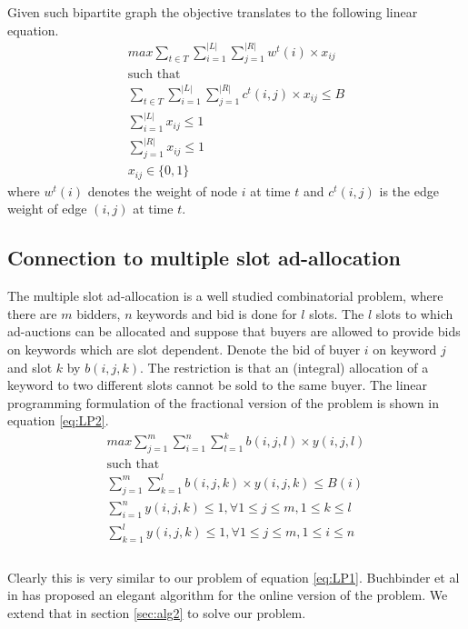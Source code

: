 Given such bipartite graph the objective translates to the following linear equation.\\
\begin{equation}\label{eq:LP1}
\begin{split}
max \sum_{t \in T} \sum_{i = 1}^{|L|} \sum_{j = 1}^{|R|} w^t(i) \times x_{ij} \\
\text{such that} \\
\sum_{t \in T} \sum_{i = 1}^{|L|} \sum_{j = 1}^{|R|} c^t(i,j) \times x_{ij} \leq B \\
\sum_{i = 1}^{|L|} x_{ij} \leq 1 \\
\sum_{j = 1}^{|R|} x_{ij} \leq 1 \\
x_{ij} \in \{ 0,1 \}
\end{split}
\end{equation}
where $w^t(i)$ denotes the weight of node $i$ at time $t$ and $c^t(i,j)$ is the edge weight of edge $(i,j)$ at time $t$.
\subsection{Connection to multiple slot ad-allocation}
The multiple slot ad-allocation is a well studied combinatorial problem, where there are $m$ bidders, $n$ keywords and bid is done for $l$ slots. The $l$ slots to which ad-auctions can be allocated and suppose that buyers are
allowed to provide bids on keywords which are slot dependent. Denote the bid of buyer $i$ on keyword $j$ and
slot $k$ by $b(i, j, k)$. The restriction is that an (integral) allocation of a keyword to two different slots cannot be
sold to the same buyer. The linear programming formulation of the fractional version of the problem is shown in equation \ref{eq:LP2}.
\begin{equation}\label{eq:LP2}
\begin{split}
max \sum_{j=1}^m \sum_{i = 1}^{n} \sum_{l = 1}^{k} b(i,j,l) \times y(i,j,l) \\
\text{such that} \\
\sum_{j =1}^m \sum_{k = 1}^{l} b(i,j,k) \times y(i,j,k) \leq B(i) \\
\sum_{i = 1}^{n} y(i,j,k) \leq 1, \forall 1 \leq j \leq m, 1\leq k \leq l \\
\sum_{k = 1}^{l} y(i,j,k) \leq 1 , \forall 1 \leq j \leq m, 1 \leq i \leq n \\
\end{split}
\end{equation}
\ \\
Clearly this is very similar to our problem of equation \ref{eq:LP1}. Buchbinder et al in \cite{buchbinder2007online} has proposed an elegant algorithm for the online version of the problem. We extend that in section \ref{sec:alg2} to solve our problem.
